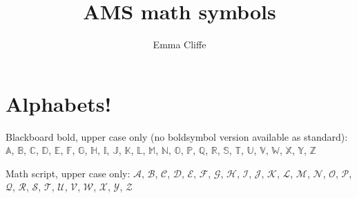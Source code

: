 \usepackage[mathscr]{eucal}
\usepackage{eufrak} 
\usepackage{longtable} 
\usepackage{spverbatim} 
\usepackage{url} 
\newtheorem{theorem}{Theorem}[section]
\title{AMS math symbols}
\author{Emma Cliffe}
\date{}
\pagestyle{headings}
\usepackage{calc}
\usepackage{longtable}
\usepackage{tabu}
\usepackage{breqn}
\setlength{\arraycolsep}{0.800000em}
\renewcommand{\arraystretch}{1.400000}

\renewcommand{\baselinestretch}{1.250000}
\selectfont
\setlength{\parskip}{1.0\baselineskip}

\maketitle

\section{Alphabets!}

\noindent 
Blackboard bold, upper case only (no boldsymbol version available as standard):
\(\mathbb{A}\), \(\mathbb{B}\), \(\mathbb{C}\), \(\mathbb{D}\), \(\mathbb{E}\), \(\mathbb{F}\), \(\mathbb{G}\), \(\mathbb{H}\), \(\mathbb{I}\), \(\mathbb{J}\), \(\mathbb{K}\), \(\mathbb{L}\), \(\mathbb{M}\), \(\mathbb{N}\), \(\mathbb{O}\), \(\mathbb{P}\), \(\mathbb{Q}\), \(\mathbb{R}\), \(\mathbb{S}\), \(\mathbb{T}\), \(\mathbb{U}\), \(\mathbb{V}\), \(\mathbb{W}\), \(\mathbb{X}\), \(\mathbb{Y}\), \(\mathbb{Z}\)

\bigskip

\noindent
Math script, upper case only:
\(\mathscr{A}\), \(\mathscr{B}\), \(\mathscr{C}\), \(\mathscr{D}\), \(\mathscr{E}\), \(\mathscr{F}\), \(\mathscr{G}\), \(\mathscr{H}\), \(\mathscr{I}\), \(\mathscr{J}\), \(\mathscr{K}\), \(\mathscr{L}\), \(\mathscr{M}\), \(\mathscr{N}\), \(\mathscr{O}\), \(\mathscr{P}\), \(\mathscr{Q}\), \(\mathscr{R}\), \(\mathscr{S}\), \(\mathscr{T}\), \(\mathscr{U}\), \(\mathscr{V}\), \(\mathscr{W}\), \(\mathscr{X}\), \(\mathscr{Y}\), \(\mathscr{Z}\)


